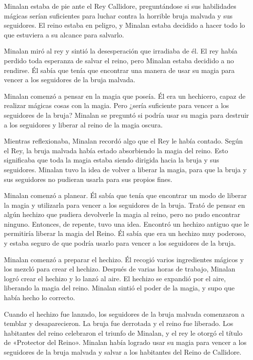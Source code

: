 
Minalan estaba de pie ante el Rey Callidore, preguntándose si sus habilidades mágicas serían suficientes para luchar contra la horrible bruja malvada y sus seguidores. El reino estaba en peligro, y Minalan estaba decidido a hacer todo lo que estuviera a su alcance para salvarlo.

Minalan miró al rey y sintió la desesperación que irradiaba de él. El rey había perdido toda esperanza de salvar el reino, pero Minalan estaba decidido a no rendirse. Él sabía que tenía que encontrar una manera de usar su magia para vencer a los seguidores de la bruja malvada.

Minalan comenzó a pensar en la magia que poseía. Él era un hechicero, capaz de realizar mágicas cosas con la magia. Pero ¿sería suficiente para vencer a los seguidores de la bruja? Minalan se preguntó si podría usar su magia para destruir a los seguidores y liberar al reino de la magia oscura.

Mientras reflexionaba, Minalan recordó algo que el Rey le había contado. Según el Rey, la bruja malvada había estado absorbiendo la magia del reino. Esto significaba que toda la magia estaba siendo dirigida hacia la bruja y sus seguidores. Minalan tuvo la idea de volver a liberar la magia, para que la bruja y sus seguidores no pudieran usarla para sus propios fines.

Minalan comenzó a planear. Él sabía que tenía que encontrar un modo de liberar la magia y utilizarla para vencer a los seguidores de la bruja. Trató de pensar en algún hechizo que pudiera devolverle la magia al reino, pero no pudo encontrar ninguno. Entonces, de repente, tuvo una idea. Encontró un hechizo antiguo que le permitiría liberar la magia del Reino. Él sabía que era un hechizo muy poderoso, y estaba seguro de que podría usarlo para vencer a los seguidores de la bruja.

Minalan comenzó a preparar el hechizo. Él recogió varios ingredientes mágicos y los mezcló para crear el hechizo. Después de varias horas de trabajo, Minalan logró crear el hechizo y lo lanzó al aire. El hechizo se expandió por el aire, liberando la magia del reino. Minalan sintió el poder de la magia, y supo que había hecho lo correcto.

Cuando el hechizo fue lanzado, los seguidores de la bruja malvada comenzaron a temblar y desaparecieron. La bruja fue derrotada y el reino fue liberado. Los habitantes del reino celebraron el triunfo de Minalan, y el rey le otorgó el título de «Protector del Reino». Minalan había logrado usar su magia para vencer a los seguidores de la bruja malvada y salvar a los habitantes del Reino de Callidore.